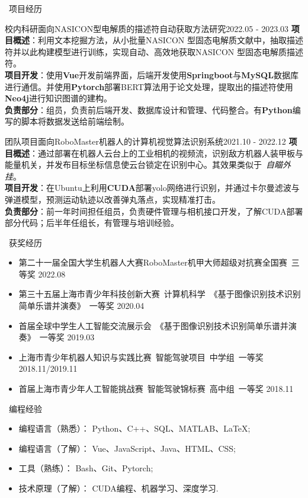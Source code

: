 \documentclass[UTF8]{resume}
\begin{document}
\begin{rSection}{\faUsers~项目经历}
    \begin{rProject}{校内科研}{面向NASICON型电解质的描述符自动获取方法研究}{2022.05 - 2023.03}
        \textbf{项目概述}：利用文本挖掘方法，从小批量NASICON 型固态电解质文献中，抽取描述符并以此构建模型进行训练，实现自动、高效地获取NASICON 型固态电解质描述符。\\
        \textbf{项目开发}：使用\textbf{Vue}开发前端界面，后端开发使用\textbf{Springboot}与\textbf{MySQL}数据库进行通信。并使用\textbf{Pytorch}部署BERT算法用于论文处理，提取出的描述符使用\textbf{Neo4j}进行知识图谱的建构。\\
        \textbf{负责部分}：组员，负责前后端开发、数据库设计和管理、代码整合。有\textbf{Python}编写的脚本将数据发送给前端绘制。
    \end{rProject}

    \begin{rProject}{团队项目}{面向RoboMaster机器人的计算机视觉算法识别系统}{2021.10 - 2022.12}
        \textbf{项目概述}：通过部署在机器人云台上的工业相机的视频流，识别敌方机器人装甲板与能量机关，并发布目标坐标信息使云台锁定在识别中心。其效果类似于~\textit{自瞄外挂}。\\
        \textbf{项目开发}：在Ubuntu上利用\textbf{CUDA}部署yolo网络进行识别，并通过卡尔曼滤波与弹道模型，预测运动轨迹以改善弹丸落点，实现精准打击。\\
        \textbf{负责部分}：前一年时间担任组员，负责硬件管理与相机接口开发，了解CUDA部署部分代码；后半年任组长，有管理与培训经验。
    \end{rProject}
\end{rSection}

\begin{rSection}{\faAward~获奖经历}
    \begin{itemize}
        \itemsep -0.5em
        \item 第二十一届全国大学生机器人大赛RoboMaster机甲大师超级对抗赛全国赛~三等奖 \hfill 2022.08
        \item 第三十五届上海市青少年科技创新大赛~计算机科学~《基于图像识别技术识别简单乐谱并演奏》~一等奖 \hfill 2020.04
        \item 首届全球中学生人工智能交流展示会~《基于图像识别技术识别简单乐谱并演奏》~一等奖 \hfill 2019.03
        \item 上海市青少年机器人知识与实践比赛~智能驾驶项目~中学组~一等奖 \hfill 2018.11/2019.11
        \item 首届上海市青少年人工智能挑战赛~智能驾驶锦标赛~高中组~一等奖 \hfill 2018.11
    \end{itemize}
\end{rSection}


\begin{rSection}{\faCogs~编程经验}
  \begin{itemize}
      \itemsep -0.5em
      \item 编程语言（熟悉）： Python、C++、SQL、MATLAB、\LaTeX; 
      \item 编程语言（了解）： Vue、JavaScript、Java、HTML、CSS;
      \item 工具（熟练）： Bash、Git、Pytorch; 
      \item 技术原理（了解）： CUDA编程、机器学习、深度学习.
  \end{itemize} 
\end{rSection}
\end{document}
